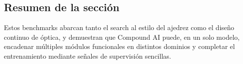 \subsection{Resumen de la sección}

Estos benchmarks abarcan tanto el search al estilo del ajedrez como el diseño continuo de óptica, y demuestran que Compound AI puede, en un solo modelo, encadenar múltiples módulos funcionales en distintos dominios y completar el entrenamiento mediante señales de supervisión sencillas.

